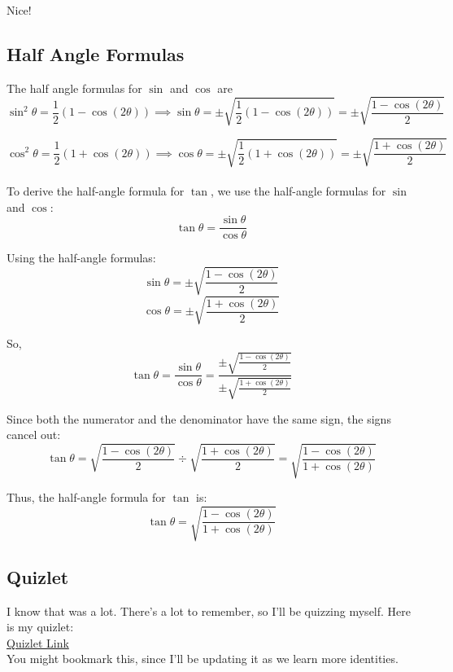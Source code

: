 \documentclass[12pt]{article}
\begin{document}
Nice!

\subsection{Half Angle Formulas}

The half angle formulas for \(\sin\) and \(\cos\) are\\
  
\[
\sin^2\theta = \frac{1}{2}(1 - \cos(2\theta)) \implies \sin\theta = \pm \sqrt{\frac{1}{2}\left(1 - \cos(2\theta)\right)} = \pm \sqrt{\frac{1 - \cos(2\theta)}{2}}
\]

\[
\cos^2\theta = \frac{1}{2}(1 + \cos(2\theta)) \implies \cos\theta = \pm \sqrt{\frac{1}{2}\left(1 + \cos(2\theta)\right)} = \pm \sqrt{\frac{1 + \cos(2\theta)}{2}}
\]\\

To derive the half-angle formula for \(\tan\), we use the half-angle formulas for \(\sin\) and \(\cos\):
\[
\tan \theta = \frac{\sin \theta}{\cos \theta}
\]

Using the half-angle formulas:
\[
\sin \theta = \pm \sqrt{\frac{1 - \cos(2\theta)}{2}}
\]
\[
\cos \theta = \pm \sqrt{\frac{1 + \cos(2\theta)}{2}}
\]

So,
\[
\tan \theta = \frac{\sin \theta}{\cos \theta} = \frac{\pm \sqrt{\frac{1 - \cos(2\theta)}{2}}}{\pm \sqrt{\frac{1 + \cos(2\theta)}{2}}}
\]

Since both the numerator and the denominator have the same sign, the signs cancel out:
\[
\tan \theta = \sqrt{\frac{1 - \cos(2\theta)}{2}} \div \sqrt{\frac{1 + \cos(2\theta)}{2}} = \sqrt{\frac{1 - \cos(2\theta)}{1 + \cos(2\theta)}}
\]

Thus, the half-angle formula for \(\tan\) is:
\[
\tan \theta = \sqrt{\frac{1 - \cos(2\theta)}{1 + \cos(2\theta)}}
\]

\subsection{Quizlet}

I know that was a lot. There's a lot to remember, so I'll be quizzing myself. Here is my quizlet:\\

\href{https://quizlet.com/928964860/precalculus-identities-flash-cards/?funnelUUID=024bad64-6810-4a54-bcac-a822e71b26c7}{Quizlet Link}\\

You might bookmark this, since I'll be updating it as we learn more identities.\\
\end{document}
